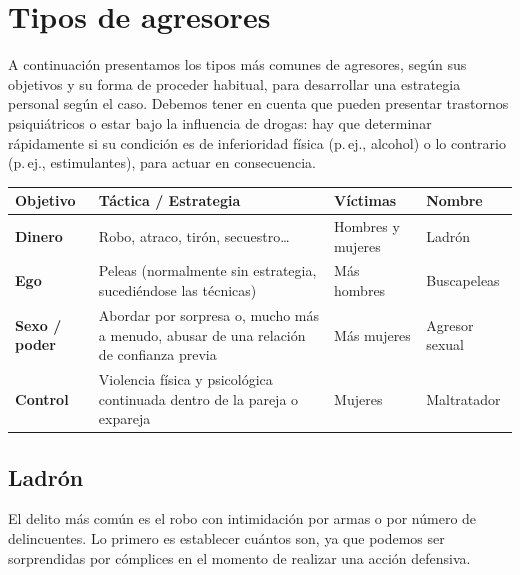 \chapter{Tipos de agresores}

A continuación presentamos los tipos más comunes de agresores, según sus objetivos y su forma de proceder habitual, para desarrollar una estrategia personal según el caso. Debemos tener en cuenta que pueden presentar trastornos psiquiátricos o estar bajo la influencia de drogas: hay que determinar rápidamente si su condición es de inferioridad física (p.\,ej., alcohol) o lo contrario (p.\,ej., estimulantes), para actuar en consecuencia.

\begin{table}[h]
\centering
\renewcommand{\arraystretch}{1.3}
\small
\begin{tabularx}{\linewidth}{@{}>{\bfseries}l X l l@{}}
\toprule
\textbf{Objetivo} & \textbf{Táctica / Estrategia} & \textbf{Víctimas} & \textbf{Nombre} \\
\midrule
Dinero & Robo, atraco, tirón, secuestro\ldots{} & Hombres y mujeres & Ladrón \\
Ego & Peleas (normalmente sin estrategia, sucediéndose las técnicas) & Más hombres & Buscapeleas \\
Sexo / poder & Abordar por sorpresa o, mucho más a menudo, abusar de una relación de confianza previa & Más mujeres & Agresor sexual \\
Control & Violencia física y psicológica continuada dentro de la pareja o expareja & Mujeres & Maltratador \\
\bottomrule
\end{tabularx}
\end{table}

\section{Ladrón}

El delito más común es el robo con intimidación por armas o por número de delincuentes. Lo primero es establecer cuántos son, ya que podemos ser sorprendidas por cómplices en el momento de realizar una acción defensiva.

